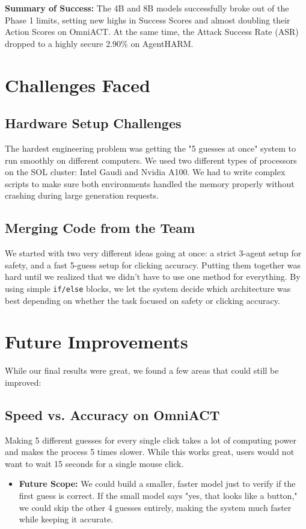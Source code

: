 \documentclass[11pt]{article}
\begin{document}
\textbf{Summary of Success:} 
The 4B and 8B models successfully broke out of the Phase 1 limits, setting new highs in Success Scores and almost doubling their Action Scores on OmniACT. At the same time, the Attack Success Rate (ASR) dropped to a highly secure 2.90\% on AgentHARM.

\section{Challenges Faced}
\subsection{Hardware Setup Challenges}
The hardest engineering problem was getting the "5 guesses at once" system to run smoothly on different computers. We used two different types of processors on the SOL cluster: Intel Gaudi and Nvidia A100. We had to write complex scripts to make sure both environments handled the memory properly without crashing during large generation requests.

\subsection{Merging Code from the Team}
We started with two very different ideas going at once: a strict 3-agent setup for safety, and a fast 5-guess setup for clicking accuracy. Putting them together was hard until we realized that we didn't have to use one method for everything. By using simple \texttt{if/else} blocks, we let the system decide which architecture was best depending on whether the task focused on safety or clicking accuracy.

\section{Future Improvements}
While our final results were great, we found a few areas that could still be improved:

\subsection{Speed vs. Accuracy on OmniACT}
Making 5 different guesses for every single click takes a lot of computing power and makes the process 5 times slower. While this works great, users would not want to wait 15 seconds for a single mouse click.
\begin{itemize}
    \item \textbf{Future Scope:} We could build a smaller, faster model just to verify if the first guess is correct. If the small model says "yes, that looks like a button," we could skip the other 4 guesses entirely, making the system much faster while keeping it accurate.
\end{itemize}
\end{document}

